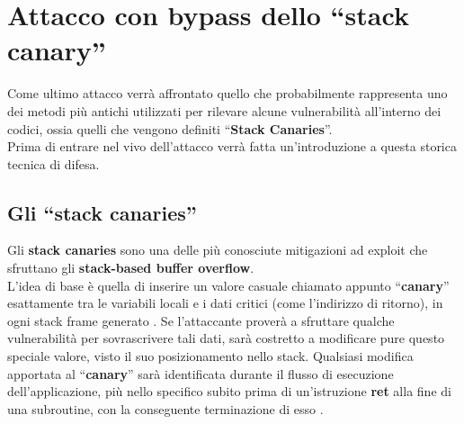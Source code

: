 \section{Attacco con bypass dello ``stack canary''}
\label{sec:Attack_5}
Come ultimo attacco verrà affrontato quello che probabilmente rappresenta uno dei metodi più antichi utilizzati per rilevare alcune vulnerabilità all'interno dei codici, ossia quelli che vengono definiti ``\textbf{Stack Canaries}''.\\
Prima di entrare nel vivo dell'attacco verrà fatta un'introduzione a questa storica tecnica di difesa.

\subsection*{Gli ``stack canaries''}
\label{sec:stack canaries}
Gli \textbf{stack canaries} sono una delle più conosciute mitigazioni ad exploit che sfruttano gli \textbf{stack-based buffer overflow}.\\L'idea di base è quella di inserire un valore casuale chiamato appunto ``\textbf{canary}'' esattamente tra le variabili locali e i dati critici (come l'indirizzo di ritorno), in ogni stack frame generato \cite*{Canary}. Se l'attaccante proverà a sfruttare qualche vulnerabilità per sovrascrivere tali dati, sarà costretto a modificare pure questo speciale valore, visto il suo posizionamento
nello stack. Qualsiasi modifica apportata al ``\textbf{canary}'' sarà identificata durante il flusso di esecuzione dell'applicazione, più nello specifico subito prima di un'istruzione \textbf{ret} alla fine di una subroutine, con la conseguente terminazione di esso \cite*{Canary2}. 

